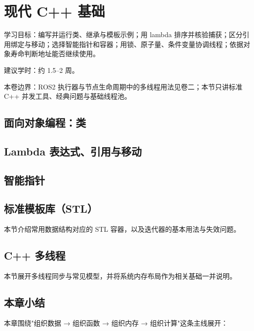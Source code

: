 \documentclass[
  lang=cn,
  scheme=chinese,
  chinesefont=ctexfont,
  11pt,
  oneside,
  device=normal,
  color=cyan,
  mode=fancy
]{../templates/elegantbook}
\begin{document}
\chapter{现代 C++ 基础}

\begin{introduction}
  \item 学习目标：编写并运行类、继承与模板示例；用 lambda 排序并核验捕获；区分引用绑定与移动；选择智能指针和容器；用锁、原子量、条件变量协调线程；依据对象寿命判断地址能否继续使用。
  \item 建议学时：约 1.5--2 周。
  \item 本卷边界：ROS2 执行器与节点生命周期中的多线程用法见卷二；本节只讲标准 C++ 并发工具、经典问题与基础线程池。
\end{introduction}

\begingroup
\setlength{\emergencystretch}{3em}
\section{面向对象编程：类}


\section{Lambda 表达式、引用与移动}


\section{智能指针}


\section{标准模板库（STL）}
本节介绍常用数据结构对应的 STL 容器，以及迭代器的基本用法与失效问题。


\section{C++ 多线程}
本节展开多线程同步与常见模型，并将系统内存布局作为相关基础一并说明。


\section{本章小结}
本章围绕"组织数据 → 组织函数 → 组织内存 → 组织计算"这条主线展开：
\end{document}
